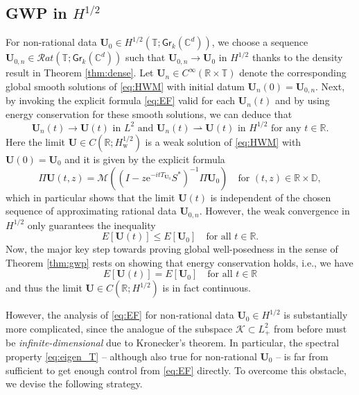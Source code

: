 \documentclass[10pt,reqno,a4paper]{amsart}
\theoremstyle{definition}
\theoremstyle{remark}
\theoremstyle{remark}
\numberwithin{equation}{section}
\newcommand{\C}{\mathbb{C}}
\newcommand{\R}{\mathbb{R}}
\newcommand{\T}{\mathbb{T}}
\newcommand{\D}{\mathbb{D}}
\newcommand{\Mean}{\mathscr{M}}
\newcommand{\be}{\begin{equation}}
\newcommand{\ee}{\end{equation}}
\newcommand{\weakto}{\rightharpoonup}
\newcommand{\eu}{\mathrm{e}}
\newcommand{\Ub}{\mathbf{U}}
\newcommand{\id}{I}
\newcommand{\Gr}{\mathsf{Gr}}
\newcommand{\Ks}{\mathscr{K}}
\begin{document}
\subsection{GWP in $H^{1/2}$}
For non-rational data $\Ub_0 \in H^{1/2}(\T; \Gr_k(\C^d))$, we  choose a sequence $\Ub_{0,n} \in \mathcal{R}at(\T; \Gr_k(\C^d))$ such that $\Ub_{0,n} \to \Ub_0$ in $H^{1/2}$ thanks to the density result in Theorem \ref{thm:dense}. Let $\Ub_n \in C^\infty(\R \times \T)$ denote the corresponding global smooth solutions of \eqref{eq:HWM} with initial datum $\Ub_n(0) = \Ub_{0,n}$. Next, by invoking the explicit formula \eqref{eq:EF} valid for each $\Ub_n(t)$ and by using energy conservation for these smooth solutions, we can deduce that
\be \label{eq:conv_U}
\mbox{$\Ub_n(t) \to \Ub(t)$ in $L^2$ and $\Ub_n(t) \weakto \Ub(t)$ in $H^{1/2}$ for any $t \in \R$}.
\ee
Here the limit $\Ub \in C(\R; H^{1/2}_{\mathrm{w}})$ is a weak solution of \eqref{eq:HWM} with $\Ub(0) = \Ub_0$ and it is given by the explicit formula
\be \tag{EF}
\Pi \Ub(t,z) = \Mean \left ( ( \id - z \eu^{-it T_{\Ub_0}} S^*)^{-1} \Pi \Ub_0 \right ) \quad \mbox{for $(t,z) \in \R \times \D$},
\ee
which in particular shows that the limit $\Ub(t)$ is independent of the chosen sequence of approximating rational data $\Ub_{0,n}$. However, the weak convergence in $H^{1/2}$ only guarantees the inequality
$$
E[\Ub(t)] \leq E[\Ub_0] \quad \mbox{for all $t \in \R$}.
$$
Now, the major key step towards proving global well-posedness in the sense of Theorem \ref{thm:gwp} rests on showing that energy conservation holds, i.e., we have 
$$
E[\Ub(t)] = E[\Ub_0] \quad \mbox{for all $t \in \R$}
$$
and thus the limit $\Ub \in C(\R; H^{1/2})$ is in fact continuous.

However, the analysis of \eqref{eq:EF} for non-rational data $\Ub_0 \in H^{1/2}$ is substantially more complicated, since the analogue of the subspace $\Ks \subset L^2_+$ from before must be {\em infinite-dimensional} due to Kronecker's theorem. In particular, the spectral property \eqref{eq:eigen_T} -- although also true for non-rational $\Ub_0$ -- is far from sufficient to get enough control from \eqref{eq:EF} directly. To overcome this obstacle, we devise the following strategy. 
\end{document}
